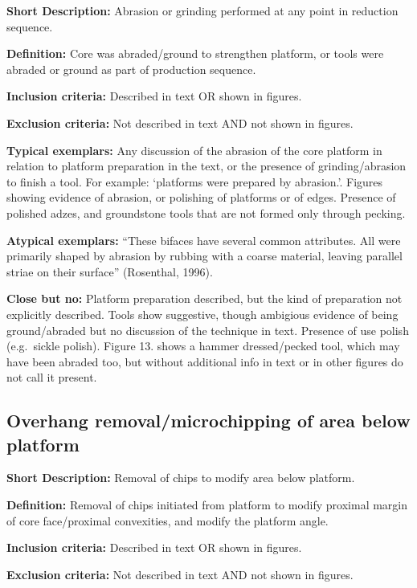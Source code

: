 \documentclass[
]{article}
\begin{document}
\textbf{Short Description:} Abrasion or grinding performed at any point
in reduction sequence.

\textbf{Definition:} Core was abraded/ground to strengthen platform, or
tools were abraded or ground as part of production sequence.

\textbf{Inclusion criteria:} Described in text OR shown in figures.

\textbf{Exclusion criteria:} Not described in text AND not shown in
figures.

\textbf{Typical exemplars:} Any discussion of the abrasion of the core
platform in relation to platform preparation in the text, or the
presence of grinding/abrasion to finish a tool. For example: `platforms
were prepared by abrasion.'. Figures showing evidence of abrasion, or
polishing of platforms or of edges. Presence of polished adzes, and
groundstone tools that are not formed only through pecking.

\textbf{Atypical exemplars:} ``These bifaces have several common
attributes. All were primarily shaped by abrasion by rubbing with a
coarse material, leaving parallel striae on their surface'' (Rosenthal,
1996).

\textbf{Close but no:} Platform preparation described, but the kind of
preparation not explicitly described. Tools show suggestive, though
ambigious evidence of being ground/abraded but no discussion of the
technique in text. Presence of use polish (e.g.~sickle polish). Figure
13. shows a hammer dressed/pecked tool, which may have been abraded too,
but without additional info in text or in other figures do not call it
present.

\hypertarget{overhang-removalmicrochipping-of-area-below-platform}{%
\subsection{Overhang removal/microchipping of area below
platform}\label{overhang-removalmicrochipping-of-area-below-platform}}

\textbf{Short Description:} Removal of chips to modify area below
platform.

\textbf{Definition:} Removal of chips initiated from platform to modify
proximal margin of core face/proximal convexities, and modify the
platform angle.

\textbf{Inclusion criteria:} Described in text OR shown in figures.

\textbf{Exclusion criteria:} Not described in text AND not shown in
figures.
\end{document}
